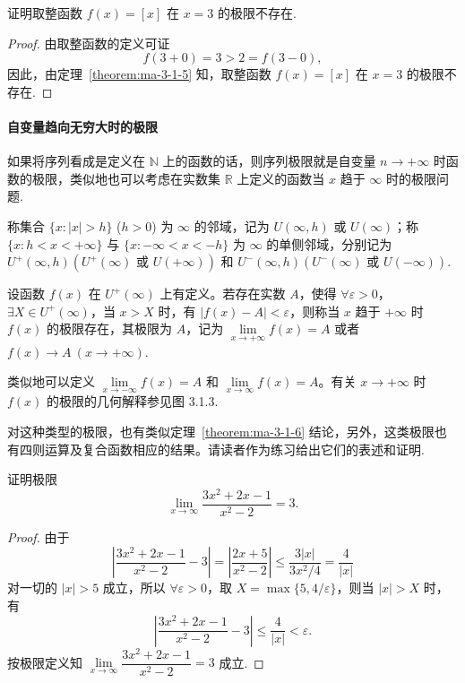 \begin{example}\label{example:ma-3-1-7}
证明取整函数 $f(x)=[x]$ 在 $x=3$ 的极限不存在.
\end{example}


\begin{proof}
由取整函数的定义可证
\[
  f(3+0)=3>2=f(3-0),
\]
因此，由定理~\ref{theorem:ma-3-1-5} 知，取整函数 $f(x)=[x]$ 在 $x=3$ 的极限不存在.
\end{proof}


\paragraph*{自变量趋向无穷大时的极限}


如果将序列看成是定义在 $\mathbb{N}$ 上的函数的话，则序列极限就是自变量 $n\to+\infty$ 时函数的极限，类似地也可以考虑在实数集 $\mathbb{R}$ 上定义的函数当 $x$ 趋于 $\infty$ 时的极限问题.

称集合 $\{x:|x|>h\}$ ($h>0$) 为 $\infty$ 的邻域，记为 $U(\infty,h)$ 或 $U(\infty)$；称 $\{x:h<x<+\infty\}$ 与 $\{x:-\infty<x<-h\}$ 为 $\infty$ 的单侧邻域，分别记为 $U^+(\infty,h)(U^+(\infty)\text{ 或 }U(+\infty))$ 和 $U^-(\infty,h)(U^-(\infty)\text{ 或 }U(-\infty))$.

\begin{definition}\label{definition:ma-3-1-3}
设函数 $f(x)$ 在 $U^+(\infty)$ 上有定义。若存在实数 $A$，使得 $\forall\varepsilon>0$，$\exists X\in U^+(\infty)$，当 $x>X$ 时，有 $|f(x)-A|<\varepsilon$，则称当 $x$ 趋于 $+\infty$ 时 $f(x)$ 的极限存在，其极限为 $A$，记为 $\lim\limits_{x\to+\infty}f(x)=A$ 或者 $f(x)\to A\ (x\to+\infty)$.
\end{definition}

类似地可以定义 $\lim\limits_{x\to-\infty}f(x)=A$ 和 $\lim\limits_{x\to\infty}f(x)=A$。有关 $x\to+\infty$ 时 $f(x)$ 的极限的几何解释参见图 3.1.3.

对这种类型的极限，也有类似定理~\ref{theorem:ma-3-1-6} 结论，另外，这类极限也有四则运算及复合函数相应的结果。请读者作为练习给出它们的表述和证明.

\begin{example}\label{example:ma-3-1-8}
证明极限
\[
  \lim_{x\to\infty}\frac{3x^2+2x-1}{x^2-2}=3.
\]
\end{example}


\begin{proof}
由于
\[
  \left|\frac{3x^2+2x-1}{x^2-2}-3\right|
  =\left|\frac{2x+5}{x^2-2}\right|
  \leqslant\frac{3|x|}{3x^2/4}=\frac{4}{|x|}
\]
对一切的 $|x|>5$ 成立，所以 $\forall\varepsilon>0$，取 $X=\max\{5,4/\varepsilon\}$，则当 $|x|>X$ 时，有
\[
  \left|\frac{3x^2+2x-1}{x^2-2}-3\right|\leqslant\frac4{|x|}<\varepsilon.
\]
按极限定义知 $\lim\limits_{x\to\infty}\dfrac{3x^2+2x-1}{x^2-2}=3$ 成立.
\end{proof}


